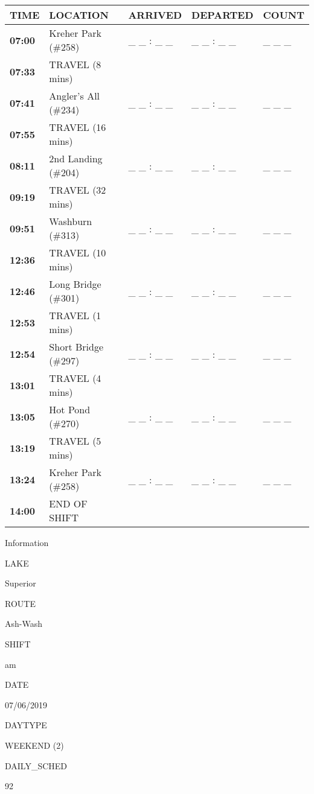 \documentclass[]{article}
\begin{document}
\begin{tabular}{>{\bfseries}lllll}
\toprule
\textbf{TIME} & \textbf{LOCATION} & \textbf{ARRIVED} & \textbf{DEPARTED} & \textbf{COUNT}\\
\midrule
07:00 & Kreher Park (\#258) & \_ \_ : \_ \_ & \_ \_ : \_ \_ & \_ \_ \_\\
07:33 & TRAVEL (8 mins) &  &  & \\
07:41 & Angler's All (\#234) & \_ \_ : \_ \_ & \_ \_ : \_ \_ & \_ \_ \_\\
07:55 & TRAVEL (16 mins) &  &  & \\
08:11 & 2nd Landing (\#204) & \_ \_ : \_ \_ & \_ \_ : \_ \_ & \_ \_ \_\\
09:19 & TRAVEL (32 mins) &  &  & \\
09:51 & Washburn (\#313) & \_ \_ : \_ \_ & \_ \_ : \_ \_ & \_ \_ \_\\
12:36 & TRAVEL (10 mins) &  &  & \\
12:46 & Long Bridge (\#301) & \_ \_ : \_ \_ & \_ \_ : \_ \_ & \_ \_ \_\\
12:53 & TRAVEL (1 mins) &  &  & \\
12:54 & Short Bridge (\#297) & \_ \_ : \_ \_ & \_ \_ : \_ \_ & \_ \_ \_\\
13:01 & TRAVEL (4 mins) &  &  & \\
13:05 & Hot Pond (\#270) & \_ \_ : \_ \_ & \_ \_ : \_ \_ & \_ \_ \_\\
13:19 & TRAVEL (5 mins) &  &  & \\
13:24 & Kreher Park (\#258) & \_ \_ : \_ \_ & \_ \_ : \_ \_ & \_ \_ \_\\
14:00 & END OF SHIFT &  &  & \\
\bottomrule
\end{tabular}\newpage

Information

LAKE

Superior

ROUTE

Ash-Wash

SHIFT

am

DATE

07/06/2019

DAYTYPE

WEEKEND (2)

DAILY\_SCHED

92

\vspace{24pt}
\end{document}

